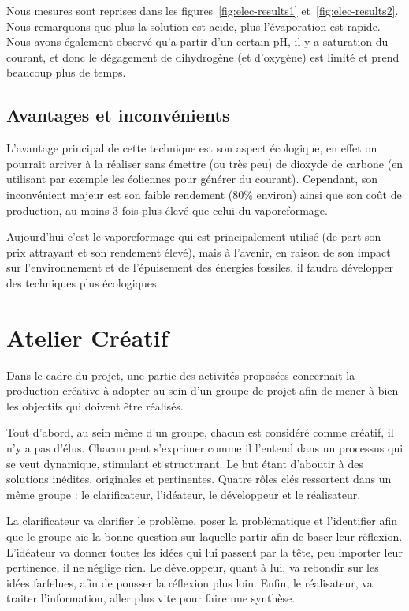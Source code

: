 Nous mesures sont reprises dans les figures~\ref{fig:elec-results1}
et~\ref{fig:elec-results2}.
Nous remarquons que plus la solution est acide, plus l'évaporation est rapide. Nous avons également observé qu'a partir d'un certain pH, il y a saturation du courant, et donc le dégagement de dihydrogène (et d'oxygène) est limité et prend beaucoup plus de temps.

\subsection{Avantages et inconvénients}
L'avantage principal de cette technique est son aspect écologique, en effet on pourrait arriver à la réaliser sans émettre (ou très peu) de dioxyde de carbone (en utilisant par exemple les éoliennes pour générer du courant). Cependant, son inconvénient majeur est son faible rendement (80\% environ) ainsi que son coût de production, au moins 3 fois plus élevé que celui du vaporeformage. \cite{wehicles-elec}

Aujourd'hui c'est le vaporeformage qui est principalement utilisé (de part son prix attrayant et son rendement élevé), mais à l'avenir, en raison de son impact sur l'environnement et de l'épuisement des énergies fossiles, il faudra développer des techniques plus écologiques. \cite{wehicles-vapo}

\section{Atelier Créatif}
Dans le cadre du projet, une partie des activités proposées concernait la production créative à adopter au sein d'un groupe de projet afin de mener à bien les objectifs qui doivent être réalisés.

Tout d'abord, au sein même d'un groupe, chacun est considéré comme créatif, il n'y a pas d'élus. Chacun peut s'exprimer comme il l'entend dans un processus qui se veut dynamique, stimulant et structurant. Le but étant d'aboutir à des solutions inédites, originales et pertinentes.
Quatre rôles clés ressortent dans un même groupe : le clarificateur, l'idéateur, le développeur et le réalisateur.

La clarificateur va clarifier le problème, poser la problématique et l'identifier afin que le groupe aie la bonne question sur laquelle partir afin de baser leur réflexion. L'idéateur va donner toutes les idées qui lui passent par la tête, peu importer leur pertinence, il ne néglige rien. Le développeur, quant à lui, va rebondir sur les idées farfelues, afin de pousser la réflexion plus loin. Enfin, le réalisateur, va traiter l'information, aller plus vite pour faire une synthèse.

